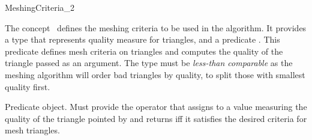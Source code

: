 \begin{ccRefConcept}{MeshingCriteria_2}

\ccDefinition

The concept \ccRefName\ defines the meshing criteria to be used in the
algorithm. It provides a type
 that represents quality measure for triangles, and a
predicate .  This predicate defines mesh criteria on triangles
and computes the quality of the triangle passed as an argument. The type
 must be \emph{less-than comparable} as the meshing algorithm
will order bad triangles by quality, to split those with smallest quality
first.

\ccTypes



 {Predicate object. Must provide the operator
   that assigns to 
  a value measuring the quality of the triangle pointed by  and
  returns  iff it satisfies the desired criteria for mesh
  triangles.}




\ccHasModels
{}\\

\end{ccRefConcept}

